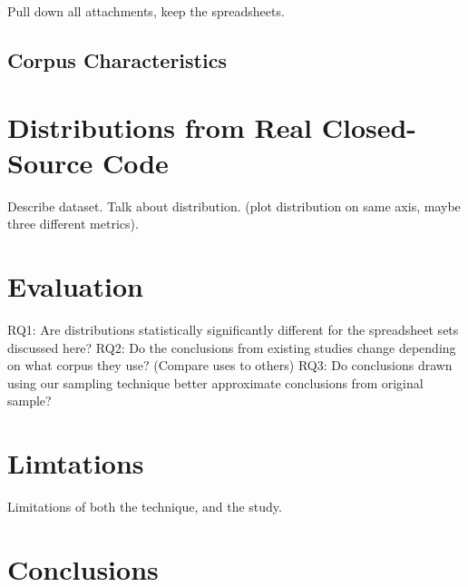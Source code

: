 \documentclass{sig-alternate} %
\begin{document}
Pull down all attachments, keep the spreadsheets.

\subsection{Corpus Characteristics}

\section{Distributions from Real Closed-Source Code}

Describe dataset.
Talk about distribution. (plot distribution on same axis, maybe three different metrics).

\section{Evaluation}

RQ1: Are distributions statistically significantly different for the spreadsheet sets discussed here?
RQ2: Do the conclusions from existing studies change depending on what corpus they use? (Compare uses to others)
RQ3: Do conclusions drawn using our sampling technique better approximate conclusions from original sample?

\section{Limtations}

Limitations of both the technique, and the study.

\section{Conclusions}
\end{document}
